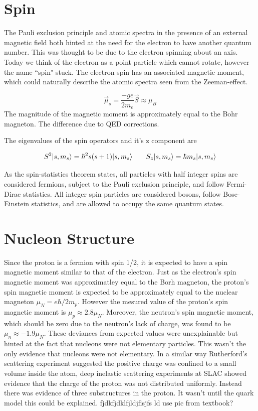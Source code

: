 \documentclass[abstract = on,listof=totoc, bibliography=totoc]{scrreprt}
\DeclarePairedDelimiter\ket{\lvert}{\rangle}
\begin{document}
\section{Spin}

The Pauli exclusion principle and atomic spectra in the presence of an external magnetic field both hinted at the need for the electron to have another quantum number. This was thought to be due to the electron spinning about an axis. Today we think of the electron as a point particle which cannot rotate, however the name ``spin" stuck. The electron spin has an associated magnetic moment, which could naturally describe the atomic spectra seen from the Zeeman-effect.  

\begin{equation}
\vec{\mu}_s = \frac{-ge}{2m_e}\vec{S} \approx \mu_B
\end{equation}
The magnitude of the magnetic moment is approximately equal to the Bohr magneton. The difference due to QED corrections.

The eigenvalues of the spin operators and it's z component are 

\begin{equation}
S^2 \ket{s,m_s} = \hbar^2s(s+1)\ket{s,m_s} \;\;\;\;\;\;\; S_z \ket{s,m_s} = \hbar m_s \ket{s,m_s}
\end{equation}

As the spin-statistics theorem states, all particles with half integer spins are considered fermions, subject to the Pauli exclusion principle, and follow Fermi-Dirac statistics. All integer spin particles are considered bosons, follow Bose-Einstein statistics, and are allowed to occupy the same quantum states. 

\section{Nucleon Structure}

Since the proton is a fermion with spin 1/2, it is expected to have a spin magnetic moment similar to that of the electron. Just as the electron's spin magnetic moment was approximatley equal to the Borh magneton, the proton's spin magnetic moment is expected to be approximately equal to the nuclear magneton $\mu_N = e\hbar/2m_p$. However the mesured value of the proton's spin magnetic moment is $\mu_p \approx 2.8 \mu_N$. Moreover, the neutron's spin magnetic moment, which should be zero due to the neutron's lack of charge,  was found to be $\mu_n \approx -1.9\mu_N$. These deviances from expected values were unexplainable but hinted at the fact that nucleons were not elementary particles. This wasn't the only evidence that nucleons were not elementary.  In a similar way Rutherford's scattering experiment suggested the positive charge was confined to a small volume inside the atom, deep inelastic scattering experiments at SLAC showed evidence that the charge of the proton was not distributed uniformly. Instead there was evidence of three substructures in the proton. It wasn't until the quark model this could be explained.
fjdkfjdklfjldjflsjfs ld use pic from textbook?
\end{document}
